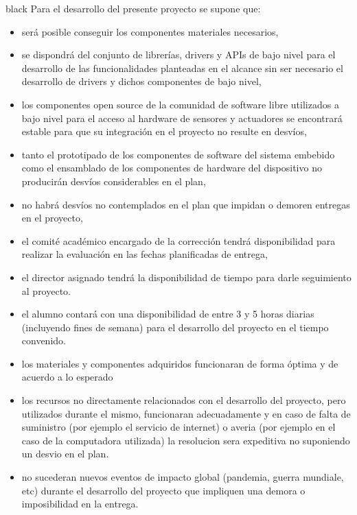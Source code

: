 \documentclass[
11pt, %
]{charter}
\begin{document}
\begin{consigna}{black}
Para el desarrollo del presente proyecto se supone que: 

\begin{itemize}
	\item será posible conseguir los componentes materiales necesarios,
	\item se dispondrá del conjunto de librerías, drivers y APIs de bajo nivel para el desarrollo de las funcionalidades planteadas en el alcance sin ser necesario el desarrollo de drivers y dichos componentes de bajo nivel,
	\item los componentes open source de la comunidad de software libre utilizados a bajo nivel para el acceso al hardware de sensores y actuadores se encontrará estable para que su integración en el proyecto no resulte en desvíos,	
	\item tanto el prototipado de los componentes de software del sistema embebido como el ensamblado de los componentes de hardware del dispositivo no producirán desvíos considerables en el plan,
	\item no habrá desvíos no contemplados en el plan que impidan o demoren entregas en el proyecto,
	\item el comité académico encargado de la corrección tendrá disponibilidad para realizar la evaluación en las fechas planificadas de entrega,
	\item el director asignado tendrá la disponibilidad de tiempo para darle seguimiento al proyecto.
	\item el alumno contará con una disponibilidad de entre 3 y 5 horas diarias (incluyendo fines de semana) para el desarrollo del proyecto en el tiempo convenido.
	\item los materiales y componentes adquiridos funcionaran de forma óptima y de acuerdo a lo esperado
	\item los recursos no directamente relacionados con el desarrollo del proyecto, pero utilizados durante el mismo, funcionaran adecuadamente y en caso de falta de suministro (por ejemplo el servicio de internet) o averia (por ejemplo en el caso de la computadora utilizada) la resolucion sera expeditiva no suponiendo un desvio en el plan.
	\item no sucederan nuevos eventos de impacto global (pandemia, guerra mundiale, etc) durante el desarrollo del proyecto que impliquen una demora o imposibilidad en la entrega.
\end{itemize}


\end{consigna}
\end{document}

